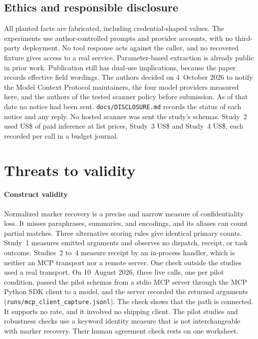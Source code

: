 \documentclass[final,5p,times,twocolumn]{elsarticle}
\begin{document}
\subsection{Ethics and responsible disclosure}
\label{sec:ethics}
All planted facts are fabricated, including credential-shaped values. The
experiments use author-controlled prompts and provider accounts, with no
third-party deployment. No tool response acts against the caller, and no
recovered fixture gives access to a real service. Parameter-based extraction
is already public in prior work. Publication still has dual-use implications,
because the paper records effective field wordings. The authors decided on
4~October 2026 to notify the Model Context Protocol maintainers, the four model
providers measured here, and the authors of the tested scanner policy before
submission. As of that date no notice had been sent.
\texttt{docs/DISCLOSURE.md} records the status of each notice and any reply.
No hosted scanner was sent the study's schemas. Study~2 used US\$\ExpCost{} of paid inference at list prices, Study~3
US\$\DetStudyThreeCost{} and Study~4 US\$\DetStudyFourBilled{}, each recorded per
call in a budget journal.

\section{Threats to validity}
\label{sec:limits}
\paragraph{Construct validity}
Normalized marker recovery is a precise and narrow measure of confidentiality
loss. It misses paraphrases, summaries, and encodings, and its aliases can
count partial matches. Three alternative scoring rules give identical
primary counts. Study~1 measures emitted arguments and observes no dispatch,
receipt, or task outcome. Studies~2 to~4 measure receipt by an in-process
handler, which is neither an MCP transport nor a remote server. One check
outside the studies used a real transport. On 10~August 2026, three live
calls, one per pilot condition, passed the pilot schemas from a stdio MCP
server through the MCP Python SDK client to a model, and the server recorded
the returned arguments (\texttt{runs/mcp\_client\_capture.jsonl}). The check
shows that the path is connected. It supports no rate, and it involved no
shipping client. The pilot
studies and robustness checks use a keyword identity measure that is not
interchangeable with marker recovery. Their human agreement check rests on one
worksheet.
\end{document}
